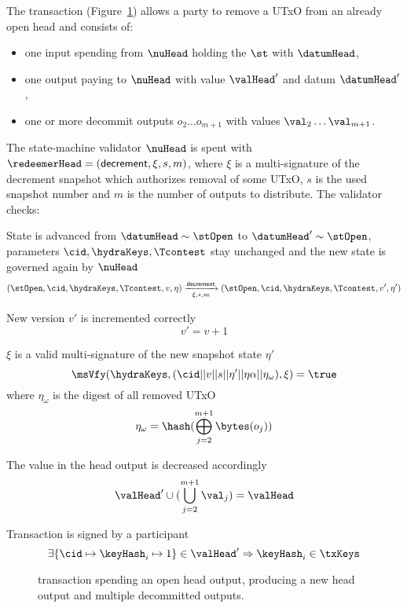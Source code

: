 \noindent The \mtxDecrement{} transaction (Figure~\ref{fig:decrementTx}) allows
a party to remove a UTxO from an already open head and consists of:

\begin{itemize}
  \item one input spending from $\nuHead$ holding the $\st$ with $\datumHead$,
  \item one output paying to $\nuHead$ with value $\valHead'$ and
  datum $\datumHead'$,
  \item one or more decommit outputs $o_{2} \dots o_{m+1}$ with values $\val_{2} \dots \val_{m+1} $.
\end{itemize}

\noindent The state-machine validator $\nuHead$ is spent with
$\redeemerHead = (\mathsf{decrement}, \xi, s, m)$, where $\xi$ is a multi-signature of
the decrement snapshot which authorizes removal of some UTxO, $s$ is the
used snapshot number and $m$ is the number of outputs to distribute. The
validator checks:
\begin{menumerate}
  \item State is advanced from $\datumHead \sim \stOpen$ to
  $\datumHead' \sim \stOpen$, parameters $\cid,\hydraKeys,\Tcontest$ stay
  unchanged and the new state is governed again by $\nuHead$
  \[
	(\stOpen,\cid,\hydraKeys,\Tcontest,v,\eta) \xrightarrow[\xi, s, m]{\mathsf{decrement}} (\stOpen,\cid,\hydraKeys,\Tcontest,v',\eta')
  \]
  \item New version $v'$ is incremented correctly
  \[
	v' = v + 1
  \]
  \item $\xi$ is a valid multi-signature of the new snapshot state $\eta'$
  \[
	\msVfy(\hydraKeys,(\cid || v || s || \eta' || \eta\alpha || \eta_\omega),\xi) = \true
  \]
  where $\eta_\omega$ is the digest of all removed UTxO
  \[
	\eta_\omega = \hash(\bigoplus_{j=2}^{m+1} \bytes(o_{j}))
  \]
  \item The value in the head output is decreased accordingly
  \[
	\valHead' \cup (\bigcup_{j=2}^{m+1} \val_{j}) = \valHead
  \]
  \item Transaction is signed by a participant
  \[
	\exists \{\cid \mapsto \keyHash_{i} \mapsto 1\} \in \valHead' \Rightarrow \keyHash_{i} \in \txKeys
  \]
\end{menumerate}

\begin{figure}
  \centering
  
  \caption{\mtxDecrement{} transaction spending an open head output,
	producing a new head output and multiple decommitted outputs.}\label{fig:decrementTx}
\end{figure}

